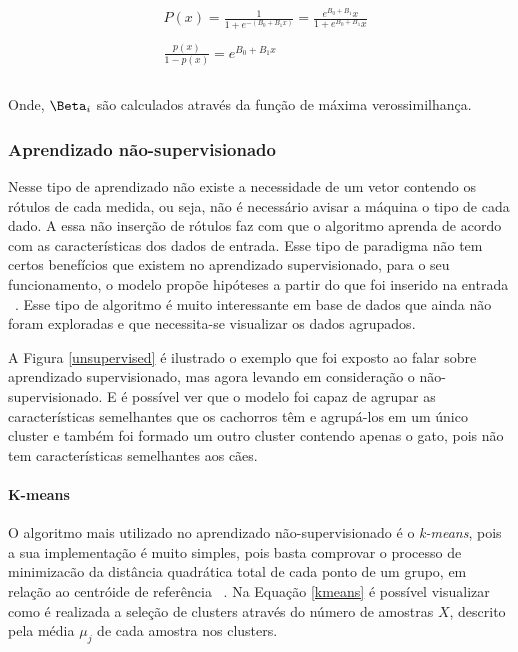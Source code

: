           \begin{equation}\label{eq:LogReg1}
            \begin{aligned}
              & P(x) = \frac{1}{1+e^{-(B_{0}+B_{1}x)}} = \frac{e^{B_{0} + B_{1}}x}{1+e^{B_{0}+B_{1}}x }\\ \\
              & \frac{p(x)}{1-p(x)} = e^{B_{0}+B_{1}x}\\ \\
          \end{aligned} 
          \end{equation}
         
          Onde, $\Beta_{i}$ são calculados através da função de máxima verossimilhança. 

    \subsubsection{Aprendizado não-supervisionado}

          Nesse tipo de aprendizado não existe a necessidade de um vetor contendo os rótulos de cada medida, ou seja, não é 
          necessário avisar a máquina o tipo de cada dado. A essa não inserção de rótulos faz com que o algoritmo aprenda de acordo 
          com as características dos dados de entrada. Esse tipo de paradigma não tem certos benefícios que existem  no aprendizado supervisionado, 
          para o seu funcionamento, o modelo propõe hipóteses a partir do que foi inserido na entrada ~\cite{bonaccorso2017machine}. Esse tipo de algoritmo 
          é muito interessante em base de dados que ainda não foram exploradas e que necessita-se visualizar os dados agrupados.

          A Figura \ref{unsupervised} é ilustrado o exemplo que foi exposto ao falar sobre aprendizado supervisionado, mas agora levando em consideração o 
          não-supervisionado. E é possível ver que o modelo foi capaz de agrupar as características semelhantes que os cachorros têm e agrupá-los em um
          único cluster e também foi formado um outro cluster contendo apenas o gato, pois não tem características semelhantes aos cães.


          \paragraph{K-means}
          O algoritmo mais utilizado no aprendizado não-supervisionado é o \textit{k-means}, pois a sua implementação é muito simples, pois basta comprovar
          o processo de minimizacão da distância quadrática total de cada ponto de um grupo, em relação ao centróide de referência ~\cite{macqueen1967some}. Na 
          Equação \ref{kmeans} é possível visualizar como é realizada a seleção de clusters através do número de amostras $X$, descrito pela média $\mu_{j}$ de 
          cada amostra nos clusters. 

